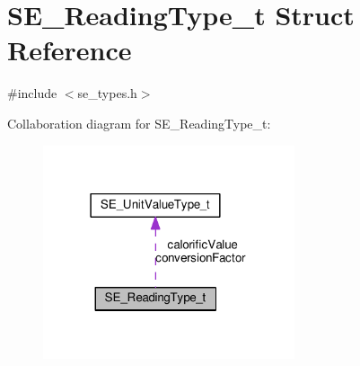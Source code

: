 \hypertarget{structSE__ReadingType__t}{}\section{S\+E\+\_\+\+Reading\+Type\+\_\+t Struct Reference}
\label{structSE__ReadingType__t}


{\ttfamily \#include $<$se\+\_\+types.\+h$>$}



Collaboration diagram for S\+E\+\_\+\+Reading\+Type\+\_\+t\+:\nopagebreak
\begin{figure}[H]
\begin{center}
\leavevmode
\includegraphics[width=210pt]{structSE__ReadingType__t__coll__graph}
\end{center}
\end{figure}
